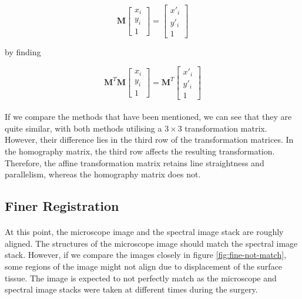\documentclass[12pt,oneside]{report}
\begin{document}
\begin{equation}
    \textbf{M}
    \begin{bmatrix}
    x_i \\ y_i \\ 1
    \end{bmatrix}
    =
    \begin{bmatrix}
    x'_i \\ y'_i \\ 1
    \end{bmatrix}
\end{equation}

by finding

\begin{equation}
    \textbf{M}^T
    \textbf{M}
    \begin{bmatrix}
    x_i \\ y_i \\ 1
    \end{bmatrix}
    =
    \textbf{M}^T
    \begin{bmatrix}
    x'_i \\ y'_i \\ 1
    \end{bmatrix}
\end{equation}

\paragraph{}
If we compare the methods that have been mentioned, we can see that they are quite similar, with both methods utilising a $3 \times 3$ transformation matrix. However, their difference lies in the third row of the transformation matrices. In the homography matrix, the third row affects the resulting transformation. Therefore, the affine transformation matrix retains line straightness and parallelism, whereas the homography matrix does not.


\subsection{Finer Registration}
\paragraph{}
At this point, the microscope image and the spectral image stack are roughly aligned. The structures of the microscope image should match the spectral image stack. However, if we compare the images closely in figure \ref{fig:fine-not-match}, some regions of the image might not align due to displacement of the surface tissue. The image is expected to not perfectly match as the microscope and spectral image stacks were taken at different times during the surgery.
\end{document}
